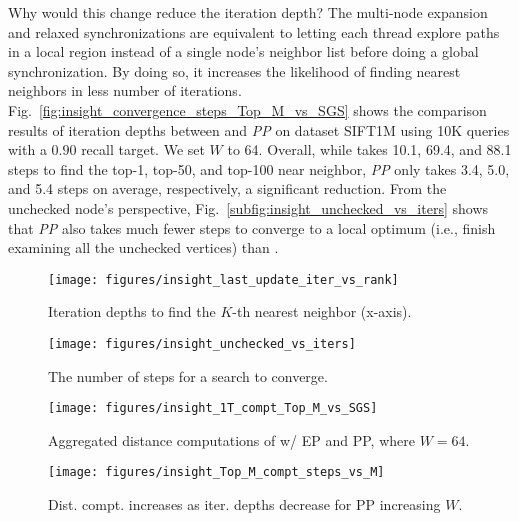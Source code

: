 Why would this change reduce the iteration depth? The multi-node expansion and relaxed synchronizations are equivalent to letting each thread explore paths in a local region instead of a single node's neighbor list before doing a global synchronization. By doing so, it increases the likelihood of finding nearest neighbors in less number of iterations. 
Fig.~\ref{fig:insight_convergence_steps_Top_M_vs_SGS} shows the comparison results of iteration depths between \SeqShortName and \emph{PP} on dataset SIFT1M using 10K queries with a $0.90$ recall target. We set $W$ to 64. Overall, while \SeqShortName takes 10.1, 69.4, and 88.1 steps to find the top-1, top-50, and top-100 near neighbor, \emph{PP} only takes 3.4, 5.0, and 5.4 steps on average, respectively, a significant reduction. From the unchecked node's perspective, Fig.~\ref{subfig:insight_unchecked_vs_iters} shows that \emph{PP} also takes much fewer steps to converge to a local optimum (i.e., finish examining all the unchecked vertices) than \SeqShortName. 

\begin{figure}[t]
    \begin{minipage}[t]{0.23\textwidth}
        \centering
        \texttt{[image: figures/insight\_last\_update\_iter\_vs\_rank]}
        \caption{Iteration depths to find the $K$-th nearest neighbor (x-axis).}
        \label{fig:insight_convergence_steps_Top_M_vs_SGS}
    \end{minipage}
    \hfill
    \begin{minipage}[t]{0.23\textwidth}
        \centering
        \texttt{[image: figures/insight\_unchecked\_vs\_iters]}
        \caption{The number of steps for a search to converge.}
        \label{subfig:insight_unchecked_vs_iters}
    \end{minipage}
        \hfill
    \begin{minipage}[t]{0.23\textwidth}
        \centering
        \texttt{[image: figures/insight\_1T\_compt\_Top\_M\_vs\_SGS]}
        \caption{
            {Aggregated distance computations of \SeqShortName w/ EP and PP, where $W = 64$.}}
        \label{fig:insight_1T_compt_Top_M_vs_SGS}
    \end{minipage}
    \hfill
    \begin{minipage}[t]{0.23\textwidth}
        \centering
        \texttt{[image: figures/insight\_Top\_M\_compt\_steps\_vs\_M]}
        \caption{
            Dist. compt. increases as iter. depths decrease for PP increasing $W$.}
        \label{fig:insight_Top_M_compt_steps_vs_M}
    \end{minipage}
\end{figure}

